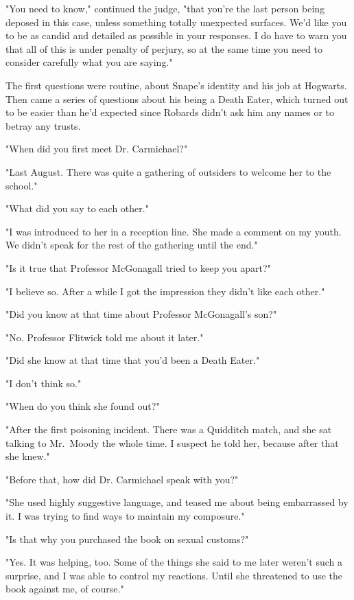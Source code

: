"You need to know," continued the judge, "that you're the last person being deposed in this case, unless something totally unexpected surfaces. We'd like you to be as candid and detailed as possible in your responses. I do have to warn you that all of this is under penalty of perjury, so at the same time you need to consider carefully what you are saying."

The first questions were routine, about Snape's identity and his job at Hogwarts. Then came a series of questions about his being a Death Eater, which turned out to be easier than he'd expected since Robards didn't ask him any names or to betray any trusts.

"When did you first meet Dr. Carmichael?"

"Last August. There was quite a gathering of outsiders to welcome her to the school."

"What did you say to each other."

"I was introduced to her in a reception line. She made a comment on my youth. We didn't speak for the rest of the gathering until the end."

"Is it true that Professor McGonagall tried to keep you apart?"

"I believe so. After a while I got the impression they didn't like each other."

"Did you know at that time about Professor McGonagall's son?"

"No. Professor Flitwick told me about it later."

"Did she know at that time that you'd been a Death Eater."

"I don't think so."

"When do you think she found out?"

"After the first poisoning incident. There was a Quidditch match, and she sat talking to Mr.~Moody the whole time. I suspect he told her, because after that she knew."

"Before that, how did Dr. Carmichael speak with you?"

"She used highly suggestive language, and teased me about being embarrassed by it. I was trying to find ways to maintain my composure."

"Is that why you purchased the book on sexual customs?"

"Yes. It was helping, too. Some of the things she said to me later weren't such a surprise, and I was able to control my reactions. Until she threatened to use the book against me, of course."


